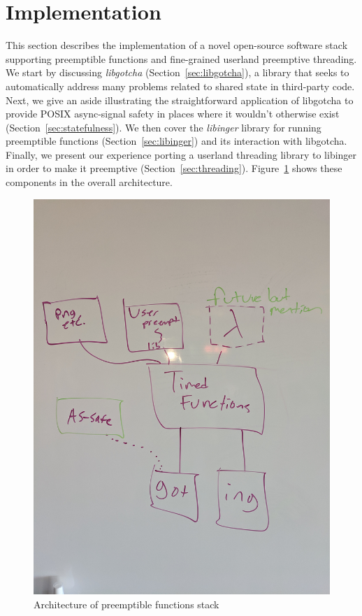 \section{Implementation}

This section describes the implementation of a novel open-source software
stack supporting preemptible functions and fine-grained userland preemptive
threading.  We start by discussing \textit{libgotcha} (Section~\ref{sec:libgotcha}),
a library that seeks to automatically address many problems related to shared state
in third-party code.  Next, we give an aside illustrating the straightforward
application of libgotcha to provide POSIX async-signal safety in places where it
wouldn't otherwise exist (Section~\ref{sec:statefulness}).  We then cover the
\textit{libinger} library for running preemptible functions
(Section~\ref{sec:libinger}) and its interaction with libgotcha.  Finally, we present
our experience porting a userland threading library to libinger in order to make
it preemptive (Section~\ref{sec:threading}).  Figure~\ref{fig:architecture} shows
these components in the overall architecture.

\begin{figure}
\includegraphics[height=\columnwidth]{figs/architecture}
\caption{Architecture of preemptible functions stack}
\label{fig:architecture}
\end{figure}



